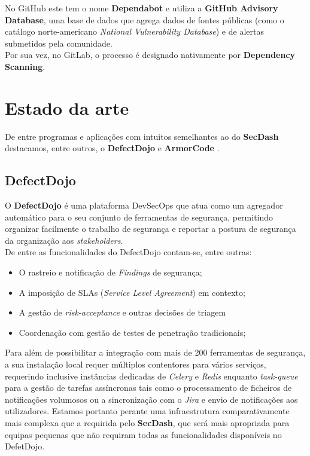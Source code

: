 No GitHub este tem o nome \textbf{Dependabot} e utiliza a \textbf{GitHub Advisory Database}, uma base de dados que agrega dados de fontes públicas (como o catálogo norte-americano \textit{National Vulnerability Database}) e de alertas submetidos pela comunidade. \\

Por sua vez, no GitLab, o processo é designado nativamente por \textbf{\textbf{Dependency Scanning}}. \\

\section{Estado da arte}

De entre programas e aplicações com intuitos semelhantes ao do \textbf{SecDash} destacamos, entre outros, o \textbf{DefectDojo} \cite{defectdojo} e \textbf{ArmorCode} \cite{armorcode}. \\

\subsection{DefectDojo}
O \textbf{DefectDojo} é uma plataforma DevSecOps que atua como um agregador automático para o seu conjunto de ferramentas de segurança, permitindo organizar facilmente o trabalho de segurança e reportar a postura de segurança da organização aos \textit{stakeholders}. \cite{aboutdefectdojo}\\

De entre as funcionalidades do DefectDojo contam-se, entre outras:
\begin{itemize}
	\item O rastreio e notificação de \textit{Findings} de segurança;
	\item A imposição de SLAs (\textit{Service Level Agreement}) em contexto;
	\item A gestão de \textit{risk-acceptance} e outras decisões de triagem
	\item Coordenação com gestão de testes de penetração tradicionais;
\end{itemize}

Para além de possibilitar a integração com mais de 200 ferramentas de segurança, a sua instalação local requer múltiplos contentores para vários serviços, requerindo inclusive instâncias dedicadas de \textit{Celery} e \textit{Redis} enquanto \textit{task-queue} para a gestão de tarefas assíncronas tais como o processamento de ficheiros de notificações volumosos ou a sincronização com o \textit{Jira} e envio de notificações aos utilizadores. Estamos portanto perante uma infraestrutura comparativamente mais complexa que a requirida pelo \textbf{SecDash}, que será mais apropriada para equipas pequenas que não requiram todas as funcionalidades disponíveis no DefetDojo.\\

